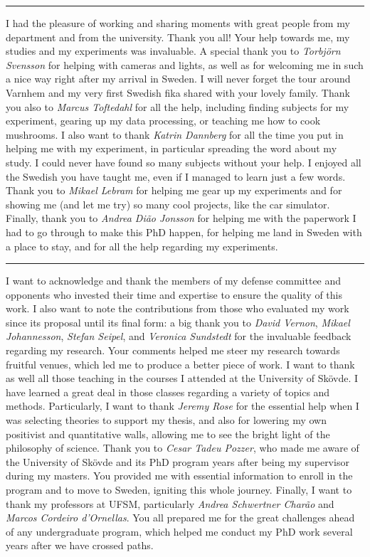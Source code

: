 \vspace{7pt}\hrule\vspace{5pt}

I had the pleasure of working and sharing moments with great people from my department and from the university. Thank you all! Your help towards me, my studies and my experiments was invaluable. A special thank you to \textit{Torbj{\"o}rn Svensson} for helping with cameras and lights, as well as for welcoming me in such a nice way right after my arrival in Sweden. I will never forget the tour around Varnhem and my very first Swedish fika shared with your lovely family. Thank you also to \textit{Marcus Toftedahl} for all the help, including finding subjects for my experiment, gearing up my data processing, or teaching me how to cook mushrooms. I also want to thank \textit{Katrin Dannberg} for all the time you put in helping me with my experiment, in particular spreading the word about my study. I could never have found so many subjects without your help. I enjoyed all the Swedish you have taught me, even if I managed to learn just a few words. Thank you to \textit{Mikael Lebram} for helping me gear up my experiments and for showing me (and let me try) so many cool projects, like the car simulator. Finally, thank you to \textit{Andrea Di{\~a}o \-Jonsson} for helping me with the paperwork I had to go through to make this PhD happen, for helping me land in Sweden with a place to stay, and for all the help regarding my experiments.

\vspace{7pt}\hrule\vspace{5pt}

I want to acknowledge and thank the members of my defense committee and opponents who invested their time and expertise to ensure the quality of this work. I also want to note the contributions from those who evaluated my work since its proposal until its final form: a big thank you to \textit{David Vernon}, \textit{Mikael Johannesson}, \textit{Stefan Seipel}, and \textit{Veronica Sundstedt} for the invaluable feedback regarding my research. Your comments helped me steer my research towards fruitful venues, which led me to produce a better piece of work. I want to thank as well all those teaching in the courses I attended at the University of Sk{\"o}vde. I have learned a great deal in those classes regarding a variety of topics and methods. Particularly, I want to thank \textit{Jeremy Rose} for the essential help when I was selecting theories to support my thesis, and also for lowering my own positivist and quantitative walls, allowing me to see the bright light of the philosophy of science. Thank you to \textit{Cesar Tadeu Pozzer}, who made me aware of the University of Sk{\"o}vde and its PhD program years after being my supervisor during my masters. You provided me with essential information to enroll in the program and to move to Sweden, igniting this whole journey. Finally, I want to thank my professors at UFSM, particularly \textit{Andrea Schwertner Char{\~a}o} and \textit{Marcos Cordeiro d'Ornellas}. You all prepared me for the great challenges ahead of any undergraduate program, which helped me conduct my PhD work several years after we have crossed paths.

